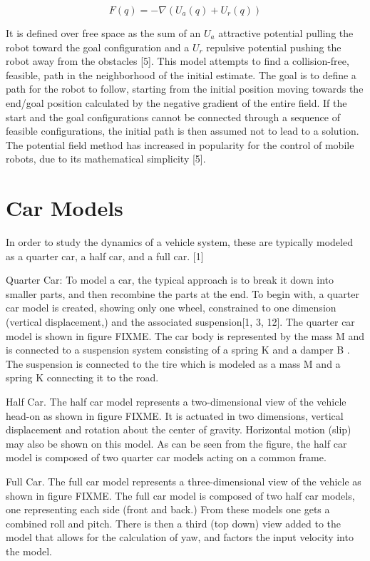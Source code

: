 $$F(q)=-\nabla(U_a(q)+U_r(q))$$

It is defined over free space as the sum of an $U_a$ attractive potential pulling the robot toward the goal configuration and a $U_r$ repulsive potential pushing the robot away from the obstacles [5]. This model attempts to find a collision-free, feasible, path in the neighborhood of the initial estimate. The goal is to define a path for the robot to follow, starting from the initial position moving towards the end/goal position calculated by the negative gradient of the entire field. If the start and the goal configurations cannot be connected through a sequence of feasible configurations, the initial path is then assumed not to lead to a solution. The potential field method has increased in popularity for the control of mobile robots, due to its mathematical simplicity [5].

\section{Car Models}
In order to study the dynamics of a vehicle system, these are typically modeled as a quarter car, a half car, and a full car. [1]

Quarter Car: To model a car, the typical approach is to break it down into smaller parts, and then recombine the parts at the end. To begin with, a quarter car model is created, showing only one wheel, constrained to one dimension (vertical displacement,) and the associated suspension[1, 3, 12]. The quarter car model is shown in figure FIXME. The car body is represented by the mass M and is connected to a suspension system consisting of a spring K and a damper B . The suspension is connected to the tire which is modeled as a mass M and a spring K connecting it to the road.


Half Car. The half car model represents a two-dimensional view of the vehicle head-on as shown in figure FIXME. It is actuated in two dimensions, vertical displacement and rotation about the center of gravity. Horizontal motion (slip) may also be shown on this model. As can be seen from the figure, the half car model is composed of two quarter car models acting on a common frame.


Full Car. The full car model represents a three-dimensional view of the vehicle as shown in figure FIXME. The full car model is composed of two half car models, one representing each side (front and back.) From these models one gets a combined roll and pitch. There is then a third (top down) view added to the model that allows for the calculation of yaw, and factors the input velocity into the model.


